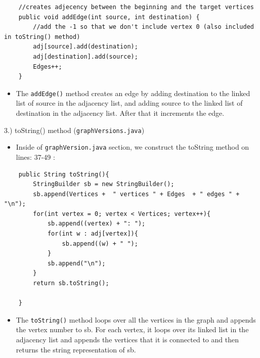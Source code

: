 \documentclass{article}
\begin{document}
\begin{verbatim}
    //creates adjecency between the beginning and the target vertices
    public void addEdge(int source, int destination) {
        //add the -1 so that we don't include vertex 0 (also included in toString() method)
        adj[source].add(destination);
        adj[destination].add(source);
        Edges++;
    }    
\end{verbatim}

\begin{itemize}

\item The \verb|addEdge()| method creates an edge by adding destination to the linked list of source in the adjacency list, and adding source to the linked list of destination in the adjacency list. After that it increments the edge.\\

\end{itemize}



\begin{large}
     3.) toString() method (\verb|graphVersions.java|)
\end{large}

\begin{itemize}

\item Inside of \verb|graphVersion.java| section, we construct the toString method on lines: 37-49 :

\end{itemize}

\begin{verbatim}
    public String toString(){
        StringBuilder sb = new StringBuilder();
        sb.append(Vertices +  " vertices " + Edges  + " edges " + "\n");
        for(int vertex = 0; vertex < Vertices; vertex++){
            sb.append((vertex) + ": ");
            for(int w : adj[vertex]){
                sb.append((w) + " ");
            }
            sb.append("\n");
        }
        return sb.toString();

    }
\end{verbatim}

\begin{itemize}

\item The \verb|toString()| method loops over all the vertices in the graph and appends the vertex number to sb. For each vertex, it loops over its linked list in the adjacency list and appends the vertices that it is connected to and then returns the string representation of sb.\\

\end{itemize}
\end{document}

